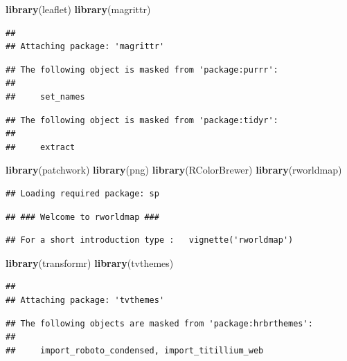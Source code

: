 \documentclass[11pt,a4paper,]{article}
\newenvironment{Shaded}{\begin{snugshade}}{\end{snugshade}}
\newcommand{\KeywordTok}[1]{\textcolor[rgb]{0.13,0.29,0.53}{\textbf{#1}}}
\newcommand{\NormalTok}[1]{#1}
\begin{document}
\begin{Shaded}
\begin{Highlighting}[]
\KeywordTok{library}\NormalTok{(leaflet)}
\KeywordTok{library}\NormalTok{(magrittr)}
\end{Highlighting}
\end{Shaded}

\begin{verbatim}
## 
## Attaching package: 'magrittr'
\end{verbatim}

\begin{verbatim}
## The following object is masked from 'package:purrr':
## 
##     set_names
\end{verbatim}

\begin{verbatim}
## The following object is masked from 'package:tidyr':
## 
##     extract
\end{verbatim}

\begin{Shaded}
\begin{Highlighting}[]
\KeywordTok{library}\NormalTok{(patchwork)}
\KeywordTok{library}\NormalTok{(png)}
\KeywordTok{library}\NormalTok{(RColorBrewer)}
\KeywordTok{library}\NormalTok{(rworldmap)}
\end{Highlighting}
\end{Shaded}

\begin{verbatim}
## Loading required package: sp
\end{verbatim}

\begin{verbatim}
## ### Welcome to rworldmap ###
\end{verbatim}

\begin{verbatim}
## For a short introduction type :   vignette('rworldmap')
\end{verbatim}

\begin{Shaded}
\begin{Highlighting}[]
\KeywordTok{library}\NormalTok{(transformr)}
\KeywordTok{library}\NormalTok{(tvthemes)}
\end{Highlighting}
\end{Shaded}

\begin{verbatim}
## 
## Attaching package: 'tvthemes'
\end{verbatim}

\begin{verbatim}
## The following objects are masked from 'package:hrbrthemes':
## 
##     import_roboto_condensed, import_titillium_web
\end{verbatim}
\end{document}
